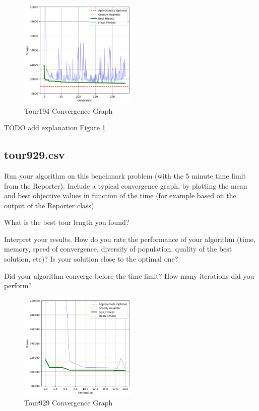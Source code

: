 \documentclass[a4paper,10pt]{article}
\newcommand{\ReplaceMe}[1]{{\color{blue}#1}}
\begin{document}
\begin{figure}[H]
    \centering
	\includegraphics[width=0.5\textwidth]{results/4.4/tour194_convergence.png}
    \caption{Tour194 Convergence Graph}
    \label{fig:tour194convergence}
\end{figure}

\ReplaceMe{TODO add explanation} Figure \ref{fig:tour194convergence}


\subsection{tour929.csv}

\ReplaceMe{Run your algorithm on this benchmark problem (with the 5 minute time limit from the Reporter). Include a typical convergence graph, by plotting the mean and best objective values in function of the time (for example based on the output of the Reporter class). 

What is the best tour length you found? 

Interpret your results. How do you rate the performance of your algorithm (time, memory, speed of convergence, diversity of population, quality of the best solution, etc)? Is your solution close to the optimal one? 

Did your algorithm converge before the time limit? How many iterations did you perform?}

\begin{figure}[H]
    \centering
	\includegraphics[width=0.5\textwidth]{results/4.5/tour929_convergence.png}
    \caption{Tour929 Convergence Graph}
    \label{fig:tour929convergence}
\end{figure}
\end{document}
